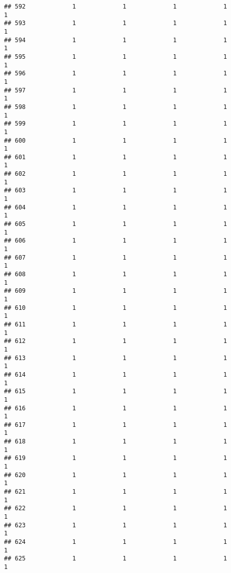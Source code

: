\documentclass[
]{article}
\begin{document}
\begin{verbatim}
## 592             1             1             1             1             1
## 593             1             1             1             1             1
## 594             1             1             1             1             1
## 595             1             1             1             1             1
## 596             1             1             1             1             1
## 597             1             1             1             1             1
## 598             1             1             1             1             1
## 599             1             1             1             1             1
## 600             1             1             1             1             1
## 601             1             1             1             1             1
## 602             1             1             1             1             1
## 603             1             1             1             1             1
## 604             1             1             1             1             1
## 605             1             1             1             1             1
## 606             1             1             1             1             1
## 607             1             1             1             1             1
## 608             1             1             1             1             1
## 609             1             1             1             1             1
## 610             1             1             1             1             1
## 611             1             1             1             1             1
## 612             1             1             1             1             1
## 613             1             1             1             1             1
## 614             1             1             1             1             1
## 615             1             1             1             1             1
## 616             1             1             1             1             1
## 617             1             1             1             1             1
## 618             1             1             1             1             1
## 619             1             1             1             1             1
## 620             1             1             1             1             1
## 621             1             1             1             1             1
## 622             1             1             1             1             1
## 623             1             1             1             1             1
## 624             1             1             1             1             1
## 625             1             1             1             1             1

\end{verbatim}
\end{document}
